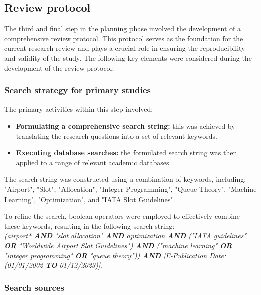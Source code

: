 \subsection{Review protocol}

The third and final step in the planning phase involved the development of a comprehensive review protocol. This protocol serves as the foundation for the current research review and plays a crucial role in ensuring the reproducibility and validity of the study. The following key elements were considered during the development of the review protocol:

\subsubsection{Search strategy for primary studies}

The primary activities within this step involved:

\begin{itemize}
    \item \textbf{Formulating a comprehensive search string:} this was achieved by translating the research questions into a set of relevant keywords.
    \item \textbf{Executing database searches:} the formulated search string was then applied to a range of relevant academic databases.
\end{itemize}

The search string was constructed using a combination of keywords, including: "Airport", "Slot", "Allocation", "Integer Programming", "Queue Theory", "Machine Learning", "Optimization", and "IATA Slot Guidelines".

To refine the search, boolean operators were employed to effectively combine these keywords, resulting in the following search string:
\\

\textit{(airport* \textbf{AND} "slot allocation" \textbf{AND}
 optimization \textbf{AND} ("IATA guidelines" \textbf{OR} "Worldwide Airport Slot Guidelines") \textbf{AND} ("machine learning" \textbf{OR} "integer programming" \textbf{OR} "queue theory")) \textbf{AND} [E-Publication Date: (01/01/2002 \textbf{TO} 01/12/2023)]}. 
\\

\subsubsection{Search sources}

